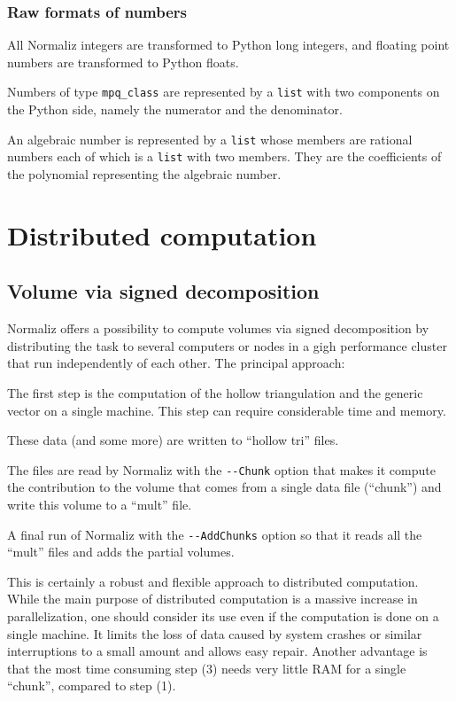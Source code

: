 \begin{small}
\subsubsection{Raw formats of numbers}

All Normaliz integers are transformed to Python long integers, and floating point numbers are transformed to Python floats.

Numbers of type \verb|mpq_class| are represented by a \verb|list| with two components on the Python side, namely the numerator and the denominator.

An algebraic number is represented by a \verb|list| whose members are rational numbers each of which is a \verb|list| with two members. They are the coefficients of the polynomial representing the algebraic number.

\end{small}

\newpage

\section{Distributed computation}

\subsection{Volume via signed decomposition}\label{distr_comp}

Normaliz offers a possibility to compute volumes via signed decomposition by distributing the task to several computers or nodes in a gigh performance cluster that run independently of each other. The principal approach:
\begin{arab}
\item The first step is the computation of the hollow triangulation and the generic vector on a single machine. This step can require considerable time and memory.
\item These data (and some more) are written to ``hollow tri'' files.
\item The files are read by Normaliz with the \verb|--Chunk| option that makes it compute the contribution to the volume that comes from a single data file (``chunk'') and write this volume to a ``mult''  file.
\item A final run of Normaliz with the \verb|--AddChunks| option so that it reads all the ``mult'' files and adds the partial volumes.
\end{arab}

This is certainly a  robust and flexible approach to distributed computation. While the main purpose of distributed computation is a massive increase in parallelization, one should consider its use even if the computation is done on a single machine. It limits the loss of data caused by system crashes or similar interruptions to a small amount and allows easy repair. Another advantage is that the most time consuming step (3) needs very little RAM for a single ``chunk'', compared to step (1). 

